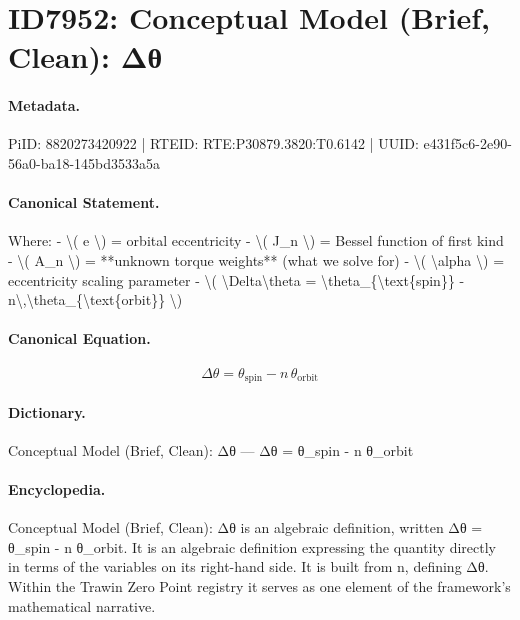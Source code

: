 \section*{ID7952: Conceptual Model (Brief, Clean): Δθ}
\paragraph{Metadata.}
PiID: 8820273420922 | RTEID: RTE:P30879.3820:T0.6142 | UUID: e431f5c6-2e90-56a0-ba18-145bd3533a5a

\paragraph{Canonical Statement.}
Where: - \textbackslash{}( e \textbackslash{}) = orbital eccentricity - \textbackslash{}( J\_n \textbackslash{}) = Bessel function of first kind - \textbackslash{}( A\_n \textbackslash{}) = **unknown torque weights** (what we solve for) - \textbackslash{}( \textbackslash{}alpha \textbackslash{}) = eccentricity scaling parameter - \textbackslash{}( \textbackslash{}Delta\textbackslash{}theta = \textbackslash{}theta\_\{\textbackslash{}text\{spin\}\} - n\textbackslash{},\textbackslash{}theta\_\{\textbackslash{}text\{orbit\}\} \textbackslash{})

\paragraph{Canonical Equation.}
\[
\Delta\theta = \theta_{\text{spin}} - n\,\theta_{\text{orbit}}
\]

\paragraph{Dictionary.}
Conceptual Model (Brief, Clean): Δθ — Δθ = θ\_spin - n θ\_orbit

\paragraph{Encyclopedia.}
Conceptual Model (Brief, Clean): Δθ is an algebraic definition, written Δθ = θ\_spin - n θ\_orbit. It is an algebraic definition expressing the quantity directly in terms of the variables on its right-hand side. It is built from n, defining Δθ. Within the Trawin Zero Point registry it serves as one element of the framework's mathematical narrative.
